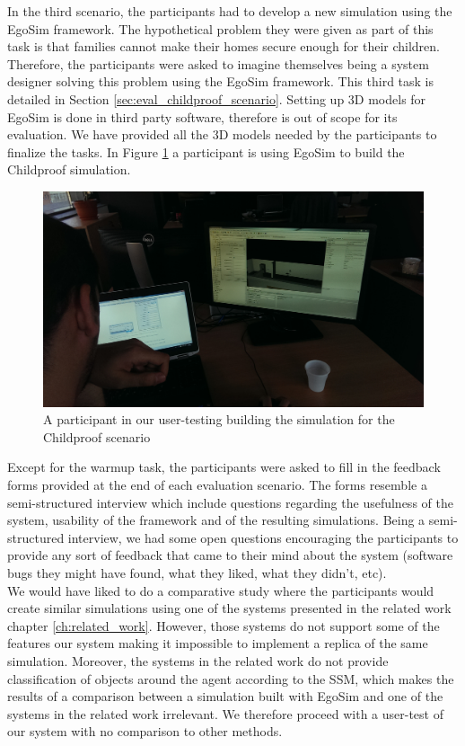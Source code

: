 In the third scenario, the participants had to develop a new simulation using the EgoSim framework. The hypothetical problem they were given as part of this task is that families cannot make their homes secure enough for their children. Therefore, the participants were asked to imagine themselves being a system designer solving this problem using the EgoSim framework. This third task is detailed in Section \ref{sec:eval_childproof_scenario}. Setting up 3D models for EgoSim is done in third party software, therefore is out of scope for its evaluation. We have provided all the 3D models needed by the participants to finalize the tasks. In Figure \ref{fig:eval_childproof_tryout} a participant is using EgoSim to build the Childproof simulation.\\
\begin{figure}[H]
	\centering
	\includegraphics[width=\linewidth]{gfx/Chapter5/childproof}
	\caption{A participant in our user-testing building the simulation for the Childproof scenario}
	\label{fig:eval_childproof_tryout}
\end{figure}

Except for the warmup task, the participants were asked to fill in the feedback forms provided at the end of each evaluation scenario. The forms resemble a semi-structured interview which include questions regarding the usefulness of the system, usability of the framework and of the resulting simulations. Being a semi-structured interview, we had some open questions encouraging the participants to provide any sort of feedback that came to their mind about the system (software bugs they might have found, what they liked, what they didn't, etc).\\

We would have liked to do a comparative study where the participants would create similar simulations using one of the systems presented in the related work chapter \ref{ch:related_work}. However, those systems do not support some of the features our system making it impossible to implement a replica of the same simulation. Moreover, the systems in the related work do not provide classification of objects around the agent according to the SSM, which makes the results of a comparison between a simulation built with EgoSim and one of the systems in the related work irrelevant. We therefore proceed with a user-test of our system with no comparison to other methods.\\

